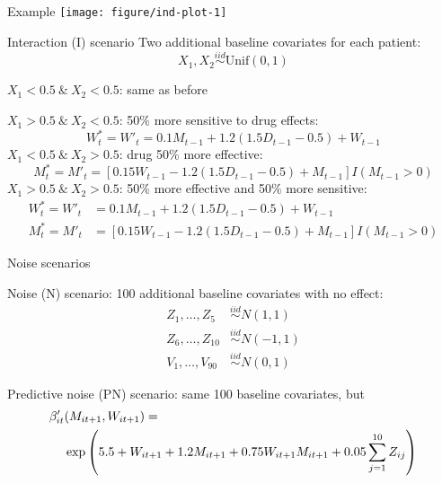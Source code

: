 \documentclass[handout]{beamer}
\begin{document}
\begin{frame}[c]{Example}
  \texttt{[image: figure/ind-plot-1]} 
\end{frame}

\begin{frame}[c]{Interaction (I) scenario}
  Two additional baseline covariates for each patient:
  \begin{equation*}
    X_{1}, X_{2} \overset{iid}{\sim} \text{Unif}(0, 1)
  \end{equation*}
  
  $X_{1} < 0.5 \ \& \ X_{2} < 0.5$: same as before
  
  
  $X_{1} > 0.5 \ \& \ X_{2} < 0.5$: 50\% more sensitive to drug effects:
  \begin{equation*}
  W^{*}_{t} = W'_{t} = 0.1 M_{t-1} + 1.2 (1.5 D_{t-1} - 0.5) + W_{t - 1}
  \end{equation*}
  $X_{1} < 0.5 \ \& \ X_{2} > 0.5$: drug 50\% more effective:
  \begin{equation*}
  M^{*}_{t} =  M'_{t} = [0.15 W_{t-1} - 1.2 (1.5 D_{t-1} - 0.5) + M_{t - 1}] I(M_{t-1} > 0)
  \end{equation*}
  $X_{1} > 0.5 \ \& \ X_{2} > 0.5$: 50\% more effective and 50\% more sensitive:
  \begin{align*}
  W^{*}_{t} = W'_{t} &= 0.1 M_{t-1} + 1.2 (1.5 D_{t-1} - 0.5) + W_{t - 1} \\
  M^{*}_{t} = M'_{t} &= [0.15 W_{t-1} - 1.2 (1.5 D_{t-1} - 0.5) + M_{t - 1}] I(M_{t-1} > 0)
  \end{align*}
\end{frame}

\begin{frame}[c]{Noise scenarios}
  
  Noise (N) scenario: 100 additional baseline covariates with no effect:
  \begin{align*}
    Z_{1}, \ldots, Z_{5} &\overset{iid}{\sim} N(1, 1) \\
    Z_{6}, \ldots, Z_{10} &\overset{iid}{\sim} N(-1, 1) \\
    V_{1}, \ldots, V_{90} &\overset{iid}{\sim} N(0, 1)
  \end{align*}
  
  Predictive noise (PN) scenario: same 100 baseline covariates, but
  \begin{align*}
    \beta'_{it}&(M_{it+1}, W_{it+1}) = \\
    &\exp\del{5.5 + W_{it+1} + 1.2 M_{it+1} + 0.75 W_{it+1} M_{it+1} + 0.05 \sum_{j = 1}^{10} Z_{ij}}
  \end{align*}
\end{frame}
\end{document}
